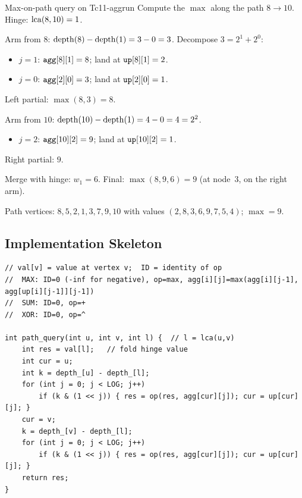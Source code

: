 \begin{example}{Max-on-path query on T}{c11-aggrun}
Compute the \(\max\) along the path \(8 \to 10\).
Hinge: \(\operatorname{lca}(8,10) = 1\).

Arm from \(8\): \(\operatorname{depth}(8)-\operatorname{depth}(1) = 3 - 0 = 3\).
Decompose \(3 = 2^1 + 2^0\):
\begin{itemize}[nosep]
  \item \(j\!=\!1\): \(\texttt{agg}[8][1] = 8\); land at \(\texttt{up}[8][1]=2\).
  \item \(j\!=\!0\): \(\texttt{agg}[2][0] = 3\); land at \(\texttt{up}[2][0]=1\).
\end{itemize}
Left partial: \(\max(8, 3) = 8\).

Arm from \(10\): \(\operatorname{depth}(10)-\operatorname{depth}(1) = 4 - 0 = 4 = 2^2\).
\begin{itemize}[nosep]
  \item \(j\!=\!2\): \(\texttt{agg}[10][2] = 9\); land at \(\texttt{up}[10][2]=1\).
\end{itemize}
Right partial: \(9\).

Merge with hinge: \(w_1 = 6\).
Final: \(\max(8, 9, 6) = \boxed{9}\) (at node~3, on the right arm).

Path vertices: \(8, 5, 2, 1, 3, 7, 9, 10\) with values
\((2,8,3,6,9,7,5,4)\); \(\max = 9\).  \checkmark
\end{example}

\subsection{Implementation Skeleton}

\begin{lstlisting}[caption={General path-aggregate query (max/sum/xor)}, label={lst:c11-pathagg}]
// val[v] = value at vertex v;  ID = identity of op
//  MAX: ID=0 (-inf for negative), op=max, agg[i][j]=max(agg[i][j-1], agg[up[i][j-1]][j-1])
//  SUM: ID=0, op=+
//  XOR: ID=0, op=^

int path_query(int u, int v, int l) {  // l = lca(u,v)
    int res = val[l];   // fold hinge value
    int cur = u;
    int k = depth_[u] - depth_[l];
    for (int j = 0; j < LOG; j++)
        if (k & (1 << j)) { res = op(res, agg[cur][j]); cur = up[cur][j]; }
    cur = v;
    k = depth_[v] - depth_[l];
    for (int j = 0; j < LOG; j++)
        if (k & (1 << j)) { res = op(res, agg[cur][j]); cur = up[cur][j]; }
    return res;
}
\end{lstlisting}

